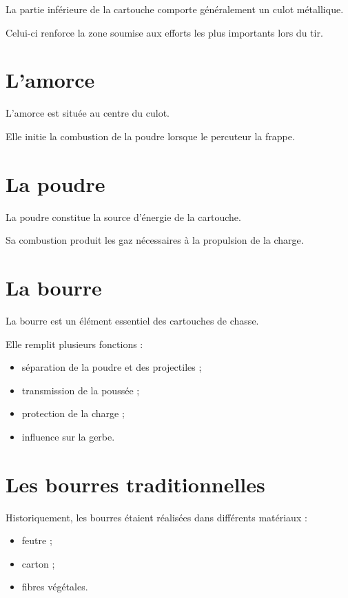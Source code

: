 La partie inférieure de la cartouche comporte généralement un culot métallique.

Celui-ci renforce la zone soumise aux efforts les plus importants lors du tir.

\section{L'amorce}

L'amorce est située au centre du culot.

Elle initie la combustion de la poudre lorsque le percuteur la frappe.

\section{La poudre}

La poudre constitue la source d'énergie de la cartouche.

Sa combustion produit les gaz nécessaires à la propulsion de la charge.

\section{La bourre}

La bourre est un élément essentiel des cartouches de chasse.

Elle remplit plusieurs fonctions :

\begin{itemize}
    \item séparation de la poudre et des projectiles ;
    \item transmission de la poussée ;
    \item protection de la charge ;
    \item influence sur la gerbe.
\end{itemize}

\section{Les bourres traditionnelles}

Historiquement, les bourres étaient réalisées dans différents matériaux :

\begin{itemize}
    \item feutre ;
    \item carton ;
    \item fibres végétales.
\end{itemize}

